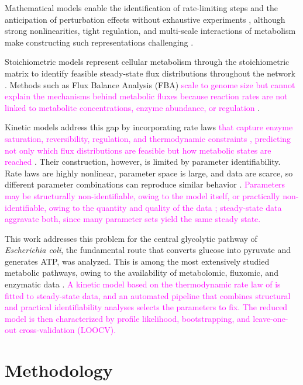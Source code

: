 \documentclass[conference]{IEEEtran}
\begin{document}
Mathematical models enable the identification of rate-limiting steps and the anticipation of perturbation effects without exhaustive experiments \cite{foster-2020}, although strong nonlinearities, tight regulation, and multi-scale interactions of metabolism make constructing such representations challenging \cite{Chassagnole2002}.

Stoichiometric models represent cellular metabolism through the stoichiometric matrix to identify feasible steady-state flux distributions throughout the network \cite{Orth2010a}. Methods such as Flux Balance Analysis (FBA) \textcolor{magenta}{scale to genome size but cannot explain the mechanisms behind metabolic fluxes because reaction rates are not linked to metabolite concentrations, enzyme abundance, or regulation}  \cite{Orth2010a}.

Kinetic models address this gap by incorporating rate laws \textcolor{magenta}{that capture enzyme saturation, reversibility, regulation, and thermodynamic constraints \cite{noor2013note}, predicting not only which flux distributions are feasible but how metabolic states are reached} \cite{Saa2017}. Their construction, however, is limited by parameter identifiability. Rate laws are highly nonlinear, parameter space is large, and data are scarce, so different parameter combinations can reproduce similar behavior \cite{foster-2020}. \textcolor{magenta}{Parameters may be structurally non-identifiable, owing to the model itself, or practically non-identifiable, owing to the quantity and quality of the data \cite{Wieland2021StructuralPracticalIdentifiability}; steady-state data aggravate both, since many parameter sets yield the same steady state.}

This work addresses this problem for the central glycolytic pathway of \textit{Escherichia coli}, the fundamental route that converts glucose into pyruvate and generates ATP, was analyzed. This is among the most extensively studied metabolic pathways, owing to the availability of metabolomic, fluxomic, and enzymatic data \cite{Ishii2007a}. \textcolor{magenta}{ A kinetic model based on the thermodynamic rate law of \textcite{noor2013note} is fitted to steady-state data, and an automated pipeline that combines structural and practical identifiability analyses selects the parameters to fix. The reduced model is then characterized by profile likelihood, bootstrapping, and leave-one-out cross-validation (LOOCV).}

\section{Methodology}
\end{document}
